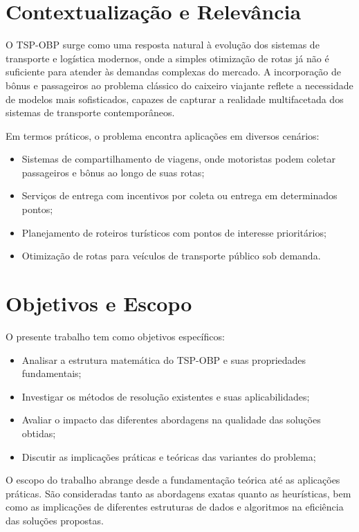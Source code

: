 \documentclass[12pt, a4paper]{report}
\begin{document}
\section{Contextualização e Relevância}

O TSP-OBP surge como uma resposta natural à evolução dos sistemas de transporte e logística modernos, onde a simples otimização de rotas já não é suficiente para atender às demandas complexas do mercado. A incorporação de bônus e passageiros ao problema clássico do caixeiro viajante reflete a necessidade de modelos mais sofisticados, capazes de capturar a realidade multifacetada dos sistemas de transporte contemporâneos.

Em termos práticos, o problema encontra aplicações em diversos cenários:
\begin{itemize}
    \item Sistemas de compartilhamento de viagens, onde motoristas podem coletar passageiros e bônus ao longo de suas rotas;
    \item Serviços de entrega com incentivos por coleta ou entrega em determinados pontos;
    \item Planejamento de roteiros turísticos com pontos de interesse prioritários;
    \item Otimização de rotas para veículos de transporte público sob demanda.
\end{itemize}

\section{Objetivos e Escopo}

O presente trabalho tem como objetivos específicos:
\begin{itemize}
    \item Analisar a estrutura matemática do TSP-OBP e suas propriedades fundamentais;
    \item Investigar os métodos de resolução existentes e suas aplicabilidades;
    \item Avaliar o impacto das diferentes abordagens na qualidade das soluções obtidas;
    \item Discutir as implicações práticas e teóricas das variantes do problema;
\end{itemize}

O escopo do trabalho abrange desde a fundamentação teórica até as aplicações práticas. São consideradas tanto as abordagens exatas quanto as heurísticas, bem como as implicações de diferentes estruturas de dados e algoritmos na eficiência das soluções propostas.
\end{document}
